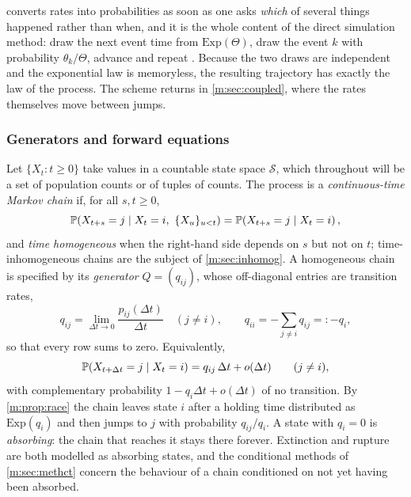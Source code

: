  converts rates into probabilities as soon as one asks
\emph{which} of several things happened rather than when, and it is the whole
content of the direct simulation method: draw the next event time from
$\mathrm{Exp}(\Theta)$, draw the event $k$ with probability $\theta_k/\Theta$,
advance and repeat \cite{Gillespie1977}. Because the two draws are independent
and the exponential law is memoryless, the resulting trajectory has exactly the
law of the process. The scheme returns in \cref{m:sec:coupled}, where the rates
themselves move between jumps.

\subsubsection{Generators and forward equations}
\label{m:sec:generator}

Let $\{X_t:t\ge0\}$ take values in a countable state space $\mathcal S$, which
throughout will be a set of population counts or of tuples of counts. The process
is a \emph{continuous-time Markov chain} if, for all $s,t\ge0$,
\begin{equation}
\label{m:eq:markov}
\mathbb{P}\!\left(X_{t+s} = j \mid X_t = i,\ \{X_u\}_{u<t}\right) = \mathbb{P}\!\left(X_{t+s}=j\mid X_t = i\right),
\end{equation}
and \emph{time homogeneous} when the right-hand side depends on $s$ but not on
$t$; time-inhomogeneous chains are the subject of \cref{m:sec:inhomog}. A
homogeneous chain is specified by its \emph{generator} $Q=(q_{ij})$, whose
off-diagonal entries are transition rates,
\begin{equation}
\label{m:eq:generator}
q_{ij} = \lim_{\Delta t\to0}\frac{p_{ij}(\Delta t)}{\Delta t}\quad(j\neq i),
\qquad
q_{ii} = -\sum_{j\neq i}q_{ij} =: -q_i ,
\end{equation}
so that every row sums to zero. Equivalently,
\begin{equation}
\label{m:eq:infinitesimal}
\mathbb{P}\!\left(X_{t+\Delta t} = j \mid X_t = i\right) = q_{ij}\,\Delta t + o(\Delta t)
\qquad (j \neq i),
\end{equation}
with complementary probability $1-q_i\Delta t+o(\Delta t)$ of no transition. By
\cref{m:prop:race} the chain leaves state $i$ after a holding time distributed
as $\mathrm{Exp}(q_i)$ and then jumps to $j$ with probability $q_{ij}/q_i$. A
state with $q_i=0$ is \emph{absorbing}: the chain that reaches it stays there
forever. Extinction and rupture are both modelled as absorbing states, and the
conditional methods of \cref{m:sec:methct} concern the behaviour of a chain
conditioned on not yet having been absorbed.

